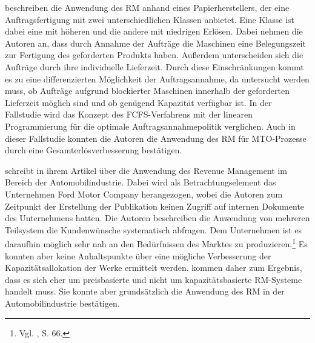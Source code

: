 \cite{kuhn2004revenue} beschreiben die Anwendung des RM anhand eines Papierherstellers, der eine Auftragsfertigung mit zwei unterschiedlichen Klassen anbietet. Eine Klasse ist dabei eine mit höheren und die andere mit niedrigen Erlösen. Dabei nehmen die Autoren an, dass durch Annahme der Aufträge die Maschinen eine Belegungszeit zur Fertigung des geforderten Produkts haben. Außerdem unterscheiden sich die Aufträge durch ihre individuelle Lieferzeit. Durch diese Einschränkungen kommt es zu eine differenzierten Möglichkeit der Auftragsannahme, da untersucht werden muss, ob Aufträge aufgrund blockierter Maschinen innerhalb der geforderten Lieferzeit möglich sind und ob genügend Kapazität verfügbar ist. In der Fallstudie wird das Konzept des FCFS-Verfahrens mit der linearen Programmierung für die optimale Auftragsannahmepolitik verglichen. Auch in dieser Fallstudie konnten die Autoren die Anwendung des RM für MTO-Prozesse durch eine Gesamterlösverbesserung bestätigen.

\cite{Specht:2008aa} schreibt in ihrem Artikel über die Anwendung des Revenue Management im Bereich der Automobilindustrie. Dabei wird als Betrachtungselement das Unternehmen \glqq Ford Motor {Company\grqq} herangezogen, wobei die Autoren zum Zeitpunkt der Erstellung der Publikation keinen Zugriff auf internen Dokumente des Unternehmens hatten. Die Autoren beschreiben die Anwendung von mehreren Teilsystem die Kundenwünsche systematisch abfragen. Dem Unternehmen ist es daraufhin möglich sehr nah an den Bedürfnissen des Marktes zu produzieren.\footnote{Vgl. \cite{Specht:2008aa}, S. 66.} Es konnten aber keine Anhaltspunkte über eine mögliche Verbesserung der Kapazitätsallokation der Werke ermittelt werden. \cite{Specht:2008aa} kommen daher zum Ergebnis, dass es sich eher um preisbasierte und nicht um kapazitätsbasierte RM-Systeme handelt muss. Sie konnte aber grundsätzlich die Anwendung des RM in der Automobilindustrie bestätigen.

